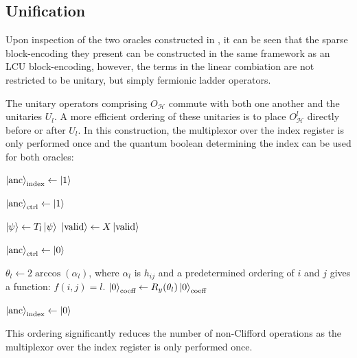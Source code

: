 \subsection{Unification}
\label{subsec:unification}

Upon inspection of the two oracles constructed in \cite{liu2024efficient}, it can be seen that the sparse block-encoding they present can be constructed in the same framework as an LCU block-encoding, however, the terms in the linear combiation are not restricted to be unitary, but simply fermionic ladder operators.

The unitary operators comprising $O_\mathcal{H}$ commute with both one another and the unitaries $U_l$. 
A more efficient ordering of these unitaries is to place $O_\mathcal{H}^l$ directly before or after $U_l$.
In this construction, the multiplexor over the index register is only performed once and the quantum boolean determining the index can be used for both oracles:
\begin{algorithmic}[1]
            \State $\ket{\text{anc}}_{\text{index}} \gets \ket{1}$
        \EndIf

            \State $\ket{\text{anc}}_{\text{ctrl}} \gets \ket{1}$
        \EndIf

            \State $\ket{\psi} \gets T_l \ket{\psi}$
            \State $\ket{\text{valid}} \gets X \ket{\text{valid}}$
        \EndIf

        \State $\ket{\text{anc}}_{\text{ctrl}} \gets \ket{0}$

            \State $\theta_l \gets 2\arccos(\alpha_l)$, where $\alpha_l$ is $h_{ij}$ and a predetermined ordering of $i$ and $j$ gives a function: $f(i, j) = l$.
            \State $\ket{0}_{\text{coeff}} \gets R_y(\theta_l) \ket{0}_{\text{coeff}}$ 
        \EndIf

        \State $\ket{\text{anc}}_{\text{index}} \gets \ket{0}$
    \EndFor
\end{algorithmic}
This ordering significantly reduces the number of non-Clifford operations as the multiplexor over the index register is only performed once.

